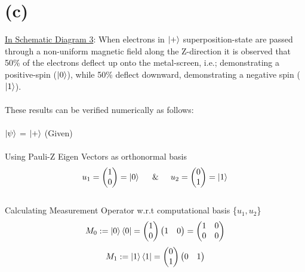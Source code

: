 \documentclass[a4paper, 12pt]{article}
\begin{document}
\section*{\small(c)}
\begin{flushleft}

 \underline{In Schematic Diagram 3}: When electrons in $\ket{+}$ superposition-state are passed through a non-uniform magnetic field along the Z-direction it is observed that 50\% of the electrons deflect up onto the metal-screen, i.e.; demonstrating a positive-spin ($\ket{0}$), while 50\% deflect downward, demonstrating a negative spin ($\ket{1}$). \\~\\
 These results can be verified numerically as follows: \\~\\
 $\ket{\psi}$ = $\ket{+}$ (Given)\\~\\
Using Pauli-Z Eigen Vectors as orthonormal basis\[u_{1} = \begin{pmatrix}
    1 \\
    0 \\
\end{pmatrix}=\ket{0}\hspace{5mm} \& \hspace{5mm}u_{2}=\begin{pmatrix}
    0 \\
    1 \\
\end{pmatrix}=\ket{1}\] \\
Calculating Measurement Operator w.r.t computational basis \{$u_{1},u_{2}$\}
\[M_{0} := \ket{0}\bra{0} =\begin{pmatrix}
    1 \\
    0 \\
\end{pmatrix}\begin{pmatrix}
    1 & 0\\
    
\end{pmatrix} = \begin{pmatrix}
    1 & 0\\
    0 & 0\\
\end{pmatrix}\]
\[M_{1} := \ket{1}\bra{1} =\begin{pmatrix}
    0 \\
    1 \\
\end{pmatrix} \begin{pmatrix}
    0 & 1\\
    

\end{pmatrix}\]
\end{flushleft}
\end{document}
